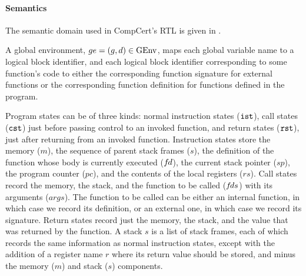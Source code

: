 \paragraph{Semantics}



The semantic domain used in CompCert's RTL is given in .


A global environment, $ge=(g,d)\in\mathrm{GEnv}$, maps each global variable name to a logical block
identifier, and each logical block identifier corresponding to some function's code to either the
corresponding function signature for external functions or the corresponding function definition for
functions defined in the program.

Program states can be of three kinds: normal instruction states ($\mathtt{ist}$), call states ($\mathtt{cst}$)
just before passing control to an invoked function, and return states ($\mathtt{rst}$), just after
returning from an invoked function.  Instruction states store the memory ($m$), the sequence of
parent stack frames ($s$), the definition of the function whose body is currently executed (${f\hspace*{-1pt}d}$),
the current stack pointer ($sp$), the program counter ($pc$), and the contents of the local
registers ($rs$).  Call states record the memory, the stack, and the function to be called (${f\hspace*{-1pt}ds}$)
with its arguments ($args$).  The function to be called can be either an internal function, in which
case we record its definition, or an external one, in which case we record its signature.  Return
states record just the memory, the stack, and the value that was returned by the function.  A stack
$s$ is a list of stack frames, each of which records the same information as normal instruction
states, except with the addition of a register name $r$ where its return value should be stored, and
minus the memory ($m$) and stack ($s$) components.

